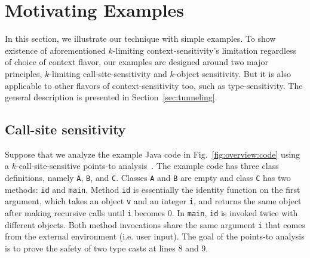 {}
\section{Motivating Examples}
\label{sec:overview}

In this section, we illustrate our technique with simple examples. To show
existence of aforementioned $k$-limiting context-sensitivity's limitation
regardless of choice of context flavor, our examples are designed around two
major principles, $k$-limiting call-site-sensitivity and $k$-object
sensitivity. But it is also applicable to other flavors of
context-sensitivity too, such as type-sensitivity.  The general description
is presented in Section~\ref{sec:tunneling}.

\subsection{Call-site sensitivity}

Suppose that we analyze the example Java code in
Fig.~\ref{fig:overview:code} using a $k$-call-site-sensitive points-to
analysis~\cite{Smaragdakis2015}.  The example code has three class
definitions, namely \texttt{A}, \texttt{B}, and \texttt{C}.  Classes
\texttt{A} and \texttt{B} are empty and class \texttt{C} has two
methods: \texttt{id} and \texttt{main}.  Method \texttt{id} is
essentially the identity function on the first argument, which takes an
object \texttt{v} and an integer \texttt{i}, and returns the same
object after making recursive calls until \texttt{i} becomes 0. In
\texttt{main}, \texttt{id} is invoked twice with different
objects. Both method invocations share the same argument \texttt{i}
that comes from the external environment (i.e. user input).  The goal
of the points-to analysis is to prove the safety of two type casts at
lines 8 and 9.

